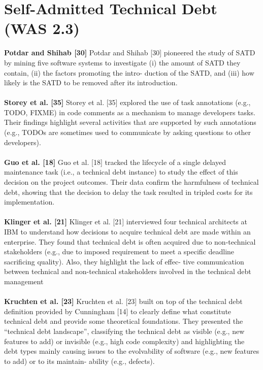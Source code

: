 \section{Self-Admitted Technical Debt (WAS 2.3)}

\textbf{Potdar and Shihab [30]}
Potdar and Shihab [30] pioneered the study of SATD by mining five software systems to investigate (i) the amount of SATD they contain, (ii) the factors promoting the intro- duction of the SATD, and (iii) how likely is the SATD to be removed after its introduction.
\\
\\
\textbf{Storey et al. [35]}
Storey et al. [35] explored the use of task annotations (e.g., TODO, FIXME) in code comments as a mechanism to manage developers tasks. Their findings highlight several
activities that are supported by such annotations (e.g., TODOs are sometimes used to communicate by asking questions to other developers).
\\
\\
\textbf{Guo et al. [18]}
Guo et al. [18] tracked the lifecycle of a single delayed maintenance task (i.e., a technical debt instance) to study the effect of this decision on the project outcomes. Their data confirm the harmfulness of technical debt, showing that the decision to delay the task resulted in tripled costs for its implementation.
\\
\\
\textbf{Klinger et al. [21]}
Klinger et al. [21] interviewed four technical architects at IBM to understand how decisions to acquire technical debt are made within an enterprise. They found that technical debt is often acquired due to non-technical stakeholders
(e.g., due to imposed requirement to meet a specific deadline sacrificing quality). Also, they highlight the lack of effec- tive communication between technical and non-technical stakeholders involved in the technical debt management
\\
\\
\textbf{Kruchten et al. [23]}
Kruchten et al. [23] built on top of the technical debt definition provided by Cunningham [14] to clearly define what constitute technical debt and provide some theoretical foundations. They presented the “technical debt landscape”, classifying the technical debt as visible (e.g., new features to add) or invisible (e.g., high code complexity) and highlighting the debt types mainly causing issues to the evolvability of software (e.g., new features to add) or to its maintain- ability (e.g., defects).
